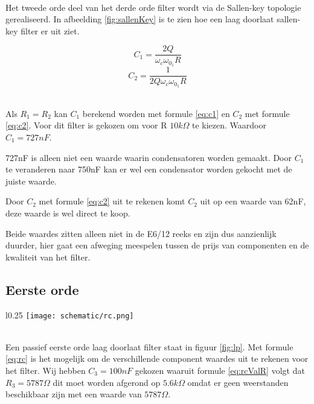 \vphantom{-}\\
\begin{minipage}{0.37\textwidth}
	Het tweede orde deel van het derde orde filter wordt via de Sallen-key topologie gerealiseerd. In afbeelding \ref{fig:sallenKey} is te zien 
	hoe een laag doorlaat sallen-key filter er uit ziet.
\end{minipage}
\hfill
\begin{minipage}{0.37\textwidth}
	\begin{equation} \label{eq:c1}
		C_1=\frac{2Q}{\omega_c\omega_{0_1}R}
	\end{equation}
	\begin{equation} \label{eq:c2}
		C_2=\frac{1}{2Q\omega_c\omega_{0_1}R}
	\end{equation}
\end{minipage}
\vphantom{-}\\

\noindent
Als $R_1 = R_2$ kan $C_1$ berekend worden met formule \ref{eq:c1} en $C_2$ met formule \ref{eq:c2}.
Voor dit filter is gekozen om voor R $10k\Omega$ te kiezen. Waardoor $C_1=727nF$.

\noindent
727nF is alleen niet een waarde waarin condensatoren worden gemaakt. Door $C_1$ te veranderen naar 750nF 
kan er wel een condensator worden gekocht met de juiste waarde. 

\noindent
Door $C_2$ met formule \ref{eq:c2} uit te rekenen komt $C_2$ uit op een waarde van 62nF, deze waarde is wel direct 
te koop. 

\noindent
Beide waardes zitten alleen niet in de E6/12 reeks en zijn dus aanzienlijk duurder, 
hier gaat een afweging meespelen tussen de prijs van componenten en de kwaliteit van het filter.

\subsection{Eerste orde}
\begin{wrapfigure}[6]{l}{0.25\textwidth}
	\texttt{[image: schematic/rc.png]}
	\caption{Eerste orde lp filter}
	\label{fig:lp}
\end{wrapfigure}
\vphantom{-}\\
Een passief eerste orde laag doorlaat filter staat in figuur \ref{fig:lp}. Met formule \ref{eq:rc} is het mogelijk om de verschillende component waardes uit te rekenen 
voor het filter. Wij hebben $C_3=100nF$ gekozen waaruit formule \ref{eq:rcValR} volgt dat 
$R_3=5787\Omega$ dit moet worden afgerond op $5.6k\Omega$ omdat er geen weerstanden beschikbaar zijn met een waarde van $5787\Omega$.

